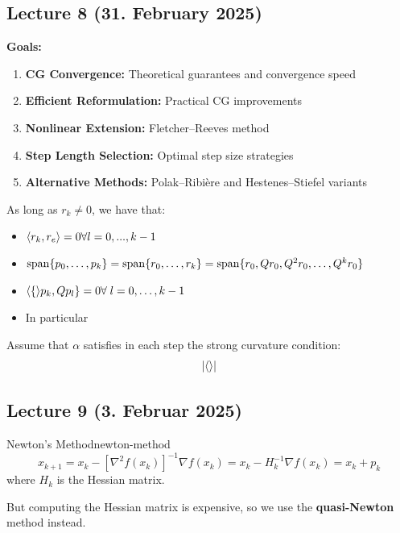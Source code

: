 \subsection{Lecture 8 (31. February 2025)}

\textbf{Goals:}
\begin{enumerate}
  \item \textbf{CG Convergence:} Theoretical guarantees and convergence speed
  \item \textbf{Efficient Reformulation:} Practical CG improvements
  \item \textbf{Nonlinear Extension:} Fletcher--Reeves method
  \item \textbf{Step Length Selection:} Optimal step size strategies
  \item \textbf{Alternative Methods:} Polak--Ribière and Hestenes--Stiefel variants
\end{enumerate}

\begin{theorem}{}{}
  As long as \(r_k \neq 0\), we have that:
  \begin{itemize}
    \item \(\langle r_k, r_e\rangle=0 \forall l = 0,...,k-1 \)
    \item \(\operatorname{span}\{p_0,\ldots, p_k\} = \operatorname{span}\{r_0, \ldots, r_k\} = \operatorname{span}\{r_0, Qr_0, Q^2r_0,\ldots, Q^k r_0\}\)
    \item \(\langle\{\rangle p_k, Qp_l\} = 0 \forall \; l=0,\ldots,k-1\)
    \item In particular
  \end{itemize}
\end{theorem}

\begin{lemma}{}{}
  Assume that \(\alpha\) satisfies in each step the strong curvature condition:
  \[
    \left|\langle\rangle\right|
  \]

\end{lemma}

\subsection{Lecture 9 (3. Februar 2025)}

\begin{definition}{Newton's Method}{newton-method}
  \[
    x_{k+1} = x_k - [\nabla^2 f(x_k)]^{-1} \nabla f(x_k) = x_k - H_k^{-1} \nabla f(x_k) = x_k + p_k
  \]
  where \( H_k \) is the Hessian matrix.
\end{definition}

But computing the Hessian matrix is expensive, so we use the \textbf{quasi-Newton} method instead.

